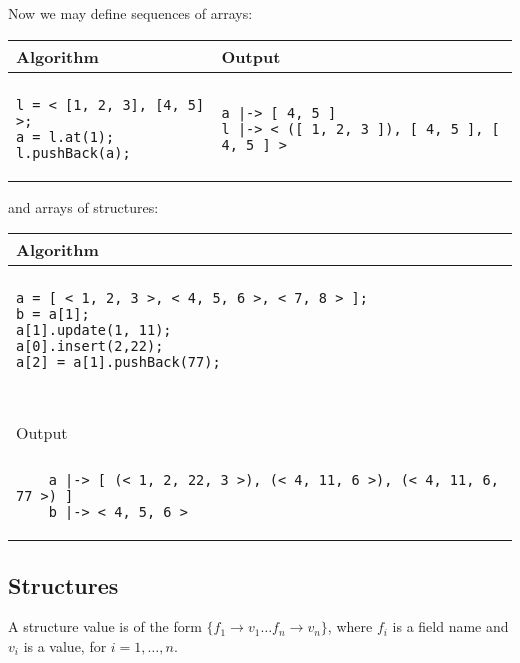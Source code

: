 \documentclass[a4paper]{report}
\begin{document}
Now we may define sequences of arrays:
\begin{center}
\begin{tabular}{ll}
Algorithm & Output\\
\hline
\\
\begin{minipage}{.35\textwidth}
\begin{verbatim}
l = < [1, 2, 3], [4, 5] >;
a = l.at(1);
l.pushBack(a);
\end{verbatim}
\end{minipage}
&
\begin{minipage}{.55\textwidth}
\begin{verbatim}
a |-> [ 4, 5 ]
l |-> < ([ 1, 2, 3 ]), [ 4, 5 ], [ 4, 5 ] >
\end{verbatim}
\end{minipage}
\end{tabular}
\end{center}
and arrays of structures:
\begin{center}
\begin{tabular}{l}
Algorithm \\
\hline
\\
\begin{minipage}{.8\textwidth}
\begin{verbatim}
a = [ < 1, 2, 3 >, < 4, 5, 6 >, < 7, 8 > ]; 
b = a[1];
a[1].update(1, 11);
a[0].insert(2,22);
a[2] = a[1].pushBack(77);
\end{verbatim}
\end{minipage}
\\
~\\
Output \\
\hline
\\
\begin{minipage}{.8\textwidth}
\begin{verbatim}
    a |-> [ (< 1, 2, 22, 3 >), (< 4, 11, 6 >), (< 4, 11, 6, 77 >) ]
    b |-> < 4, 5, 6 >
\end{verbatim}
\end{minipage}
\end{tabular}
\end{center}

\subsection{Structures}

A structure value is of the form $\{ f_1\to v_1\ldots f_n\to v_n\}$, where $f_i$ is a field name and $v_i$ is a value, for $i=1,\ldots,n$.
\end{document}
